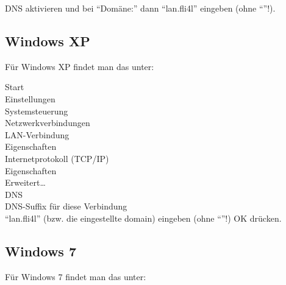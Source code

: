   DNS aktivieren und bei ``Domäne:'' dann ``lan.fli4l'' eingeben (ohne ``''!).

\subsection{Windows XP}

  Für Windows XP findet man das unter:

  \noindent Start \pfeil\\
  \hspace*{2ex}Einstellungen \pfeil\\
  \hspace*{4ex}Systemsteuerung \pfeil\\
  \hspace*{6ex}Netzwerkverbindungen \pfeil\\
  \hspace*{8ex}LAN-Verbindung \pfeil\\
  \hspace*{10ex}Eigenschaften \pfeil\\
  \hspace*{12ex}Internetprotokoll (TCP/IP) \pfeil\\
  \hspace*{14ex}Eigenschaften \pfeil\\
  \hspace*{16ex}Erweitert\ldots \pfeil\\
  \hspace*{18ex}DNS \pfeil\\
  \hspace*{20ex}DNS-Suffix für diese Verbindung \pfeil\\

  ``lan.fli4l'' (bzw. die eingestellte domain) eingeben (ohne ``''!)
  \pfeil OK drücken.

\subsection{Windows 7}

  Für Windows 7 findet man das unter:

